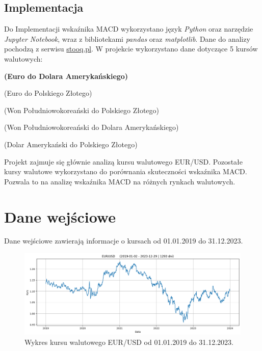 \documentclass[12pt, a4paper]{article}
\begin{document}
\subsection{Implementacja}
Do Implementacji wskaźnika MACD wykorzystano język \textit{Python} oraz narzędzie
\textit{Jupyter Notebook}, wraz z bibliotekami \textit{pandas} oraz \textit{matplotlib}.
Dane do analizy pochodzą z serwisu \href{https://stooq.pl/}{stooq.pl}.
W projekcie wykorzystano dane dotyczące 5 kursów walutowych:
\small
\begin{description}
    \setlength\itemsep{0.01em}
    \item[EUR/USD] \textbf{(Euro do Dolara Amerykańskiego)}
    \item[EUR/PLN] (Euro do Polskiego Złotego)
    \item[KRW/PLN] (Won Południowokoreański do Polskiego Złotego)
    \item[KRW/USD] (Won Południowokoreański do Dolara Amerykańskiego)
    \item[USD/PLN] (Dolar Amerykański do Polskiego Złotego)
\end{description}
\small
Projekt zajmuje się głównie analizą kursu walutowego EUR/USD. Pozostałe kursy
walutowe wykorzystano do porównania skuteczności wskaźnika MACD.
Pozwala to na analizę wskaźnika MACD na różnych rynkach walutowych.

\pagebreak






\section{Dane wejściowe}

Dane wejściowe zawierają informacje o kursach od 01.01.2019 do 31.12.2023.

\begin{figure}[ht]
    \centering
    \includegraphics[width=1.0\textwidth]{eur_usd_value.png}
    \caption{Wykres kursu walutowego EUR/USD od 01.01.2019 do 31.12.2023.}
    \label{fig:eur_usd_value}
\end{figure}
\end{document}
